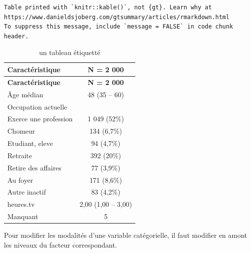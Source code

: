\documentclass[
  letterpaper,
  DIV=11,
  numbers=noendperiod,
  oneside]{scrreprt}
\begin{document}
\begin{verbatim}
Table printed with `knitr::kable()`, not {gt}. Learn why at
https://www.danieldsjoberg.com/gtsummary/articles/rmarkdown.html
To suppress this message, include `message = FALSE` in code chunk header.
\end{verbatim}

\hypertarget{tbl-tableau-etiquette}{}
\begin{longtable}[]{@{}lc@{}}
\caption{\label{tbl-tableau-etiquette}un tableau
étiquetté}\tabularnewline
\toprule()
\textbf{Caractéristique} & \textbf{N = 2 000} \\
\midrule()
\endfirsthead
\toprule()
\textbf{Caractéristique} & \textbf{N = 2 000} \\
\midrule()
\endhead
Âge médian & 48 (35 -- 60) \\
Occupation actuelle & \\
Exerce une profession & 1 049 (52\%) \\
Chomeur & 134 (6,7\%) \\
Etudiant, eleve & 94 (4,7\%) \\
Retraite & 392 (20\%) \\
Retire des affaires & 77 (3,9\%) \\
Au foyer & 171 (8,6\%) \\
Autre inactif & 83 (4,2\%) \\
heures.tv & 2,00 (1,00 -- 3,00) \\
Manquant & 5 \\
\bottomrule()
\end{longtable}

Pour modifier les modalités d'une variable catégorielle, il faut
modifier en amont les niveaux du facteur correspondant.
\end{document}
